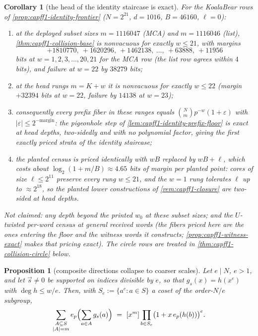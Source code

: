 \documentclass[11pt]{article}
\newtheorem{proposition}[proposition]{Proposition}
\newtheorem{corollary}[corollary]{Corollary}
\theoremstyle{definition}
\theoremstyle{remark}
\begin{document}
\begin{corollary}[the head of the identity staircase is exact]\label{cor:capff1-collision-head}
For the KoalaBear rows of \cref{prop:capff1-identity-frontier} \textup{($N=2^{21}$, $d=1016$, $B=46160$, $\ell=0$)}:
\begin{enumerate}[label=\textup{(\alph*)}]
\item at the deployed subset sizes $m=1116047$ \textup{(MCA)} and $m=1116046$ \textup{(list)}, \cref{thm:capff1-collision-base} is nonvacuous for exactly $w\le21$, with margins
\[
+1810770,\ +1620296,\ +1462138,\ \ldots,\ +63888,\ +11956
\]
bits at $w=1,2,3,\ldots,20,21$ for the MCA row \textup{(the list row agrees within $4$ bits)}, and failure at $w=22$ by $38279$ bits;
\item at the head rungs $m=K+w$ it is nonvacuous for exactly $w\le22$ \textup{(margin $+32394$ bits at $w=22$, failure by $14138$ at $w=23$)};
\item consequently every prefix fiber in these ranges equals $\binom Nm p^{-w}(1+\varepsilon)$ with $|\varepsilon|\le2^{-\mathrm{margin}}$: the pigeonhole step of \cref{lem:capff1-identity-prefix-floor} is \emph{exact} at head depths, two-sidedly and with no polynomial factor, giving the first exactly priced strata of the identity staircase;
\item the planted census is priced identically with $wB$ replaced by $wB+\ell$, which costs about $\log_2(1+m/B)\approx4.65$ bits of margin per planted point: cores of size $\ell\le2^{11}$ preserve every rung $w\le21$, and the $w=1$ rung tolerates $\ell$ up to $\approx2^{18}$, so the planted lower constructions of \cref{rem:capff1-closure} are two-sided at head depths.
\end{enumerate}
Not claimed: any depth beyond the printed $w_0$ at these subset sizes; and the $U$-twisted per-word census at general received words \textup{(the fibers priced here are the ones entering the floor and the witness words it constructs; \cref{prop:capff1-witness-exact} makes that pricing exact)}.  The circle rows are treated in \cref{thm:capff1-collision-circle} below.
\end{corollary}

\begin{proposition}[composite directions collapse to coarser scales]\label{prop:capff1-composite}
Let $e\mid N$, $e>1$, and let $\vec s\ne0$ be supported on indices divisible by $e$, so that $g_s(x)=h(x^e)$ with $\deg h\le w/e$.  Then, with $S_e:=\{a^e:a\in S\}$ a coset of the order-$N/e$ subgroup,
\[
        \sum_{\substack{A\subseteq S\\|A|=m}}e_p\Bigl(\sum_{a\in A}g_s(a)\Bigr)
        \ =\ [x^m]\prod_{b\in S_e}\bigl(1+x\,e_p(h(b))\bigr)^{e}.
\]
\end{proposition}
\end{document}
